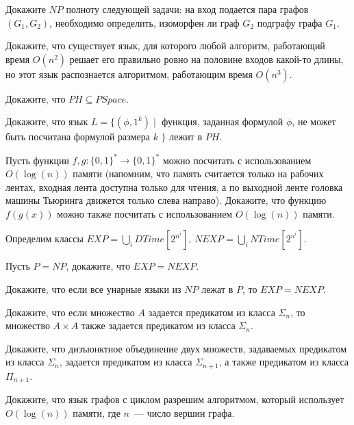 \setcounter{curtask}{37}


\begin{task}
    Докажите $NP$ полноту следующей задачи:
    на вход подается пара графов $(G_1, G_2)$, необходимо определить, изоморфен ли
    граф $G_2$ подграфу графа $G_1$.
\end{task}

\begin{task}
    Докажите, что существует язык, для которого любой алгоритм, работающий время
    $O(n^2)$ решает его правильно ровно на половине входов какой-то длины, но
    этот язык распознается алгоритмом, работающим время $O(n^3)$.
\end{task}

\begin{task}
    Докажите, что $PH \subseteq PSpace$.
\end{task}

\begin{task}
    Докажите, что язык $L = \{(\phi, 1^k) \mid$ функция, заданная формулой $\phi$, не может быть посчитана формулой размера $k$ $\}$
    лежит в $PH$.
\end{task}


\begin{task}
    Пусть функции $f, g: \{0, 1\}^* \rightarrow \{0, 1\}^*$ можно посчитать с
    использованием $O(\log(n))$ памяти (напомним, что память считается только на
    рабочих лентах, входная лента доступна только для чтения, а по выходной ленте
    головка машины Тьюринга движется только слева направо). Докажите, что функцию
    $f(g(x))$ можно также посчитать с использованием $O(\log(n))$ памяти.
\end{task}

Определим классы $EXP = \bigcup\limits_{i}DTime[2^{n^i}]$,  $NEXP = \bigcup\limits_{i}NTime[2^{n^i}]$.

\begin{task}
	Пусть $P = NP$, докажите, что  $EXP = NEXP$.
\end{task}

\begin{task}
	Докажите, что если все унарные языки из $NP$ лежат в $P$, то $EXP = NEXP$.
\end{task}


\breakline

\begin{ptask}{23}
    Докажите, что если множество $A$ задается предикатом из класса $\Sigma_n$, то
    множество $A \times A$ также задается предикатом из класса $\Sigma_n$.
\end{ptask}

\begin{ptask}{24}
    Докажите, что дизъюнктное объединение двух множеств, задаваемых предикатом из
    класса $\Sigma_n$, задается предикатом из класса $\Sigma_{n + 1}$, а также
    предикатом из класса $\Pi_{n + 1}$.
\end{ptask}


\begin{ptask}{35}
    Докажите, что язык графов с циклом разрешим алгоритмом, который использует
    $O(\log(n))$ памяти, где $n$~--- число вершин графа.
\end{ptask}


